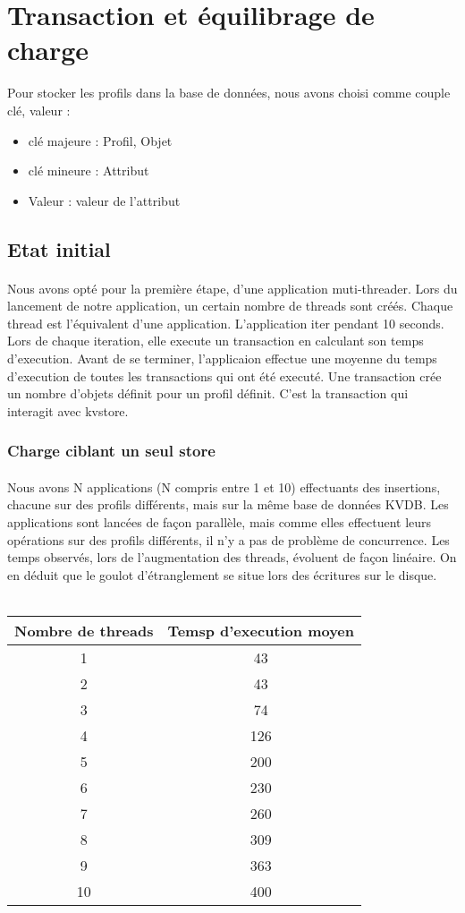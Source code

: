 \section{Transaction et équilibrage de charge}

Pour stocker les profils dans la base de données, nous avons choisi comme couple {clé, valeur} :
\begin{itemize}
\item clé majeure : Profil, Objet
\item clé mineure : Attribut
\item Valeur : valeur de l'attribut
\end{itemize}

\subsection{Etat initial}
\paragraph{}
Nous avons opté pour la première étape, d'une application muti-threader. Lors du lancement de notre application, un certain nombre de threads sont créés. Chaque thread est l'équivalent d'une application. L'application iter pendant 10 seconds. Lors de chaque iteration, elle execute un transaction en calculant son temps d'execution. Avant de se terminer, l'applicaion effectue une moyenne du temps d'execution de toutes les transactions qui ont été executé.
Une transaction crée un nombre d'objets définit pour un profil définit. C'est la transaction qui interagit avec kvstore.

\subsubsection{Charge ciblant un seul store}
\paragraph{}
Nous avons N applications (N compris entre 1 et 10) effectuants des insertions, chacune sur des profils différents, mais sur la même base de données KVDB. Les applications sont lancées de façon parallèle, mais comme elles effectuent leurs opérations sur des profils différents, il n'y a pas de problème de concurrence.
Les temps observés, lors de l'augmentation des threads, évoluent de façon linéaire. On en déduit que le goulot d'étranglement se situe lors des écritures sur le disque.
\\
\\
\begin{tabular}{|c|c|}
    \hline
    Nombre de threads & Temsp d'execution moyen \tabularnewline
    \hline
    1 & 43 \tabularnewline
    2 & 43 \tabularnewline
    3 & 74 \tabularnewline
    4 & 126 \tabularnewline
    5 & 200 \tabularnewline
    6 & 230 \tabularnewline
    7 & 260 \tabularnewline
    8 & 309 \tabularnewline
    9 & 363 \tabularnewline
    10 & 400 \tabularnewline
    \hline
 \end{tabular}

